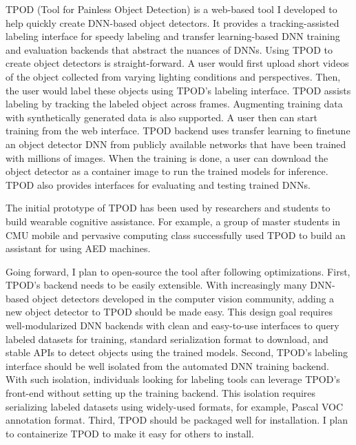 
TPOD (Tool for Painless Object Detection) is a web-based tool I developed to
help quickly create DNN-based object detectors. It provides a tracking-assisted
labeling interface for speedy labeling and transfer learning-based DNN training
and evaluation backends that abstract the nuances of DNNs. Using TPOD to create
object detectors is straight-forward. A user would first upload short videos of
the object collected from varying lighting conditions and perspectives. Then,
the user would label these objects using TPOD's labeling interface. TPOD assists
labeling by tracking the labeled object across frames. Augmenting training data
with synthetically generated data is also supported. A user then can start training
from the web interface. TPOD backend uses transfer learning to finetune an
object detector DNN from publicly available networks that have been trained with
millions of images. When the training is done, a user can download the object
detector as a container image to run the trained models for inference. TPOD also
provides interfaces for evaluating and testing trained DNNs.

The initial prototype of TPOD has been used by researchers and students to build
wearable cognitive assistance. For example, a group of master students in CMU
mobile and pervasive computing class successfully used TPOD to build an
assistant for using AED machines.

Going forward, I plan to open-source the tool after following optimizations.
First, TPOD's backend needs to be easily extensible. With increasingly many
DNN-based object detectors developed in the computer vision community, adding a
new object detector to TPOD should be made easy. This design goal requires
well-modularized DNN backends with clean and easy-to-use interfaces to query
labeled datasets for training, standard serialization format to download, and
stable APIs to detect objects using the trained models. Second, TPOD's labeling
interface should be well isolated from the automated DNN training backend. With
such isolation, individuals looking for labeling tools can leverage TPOD's
front-end without setting up the training backend. This isolation requires
serializing labeled datasets using widely-used formats, for example, Pascal VOC
annotation format. Third, TPOD should be packaged well for installation. I plan
to containerize TPOD to make it easy for others to install.

